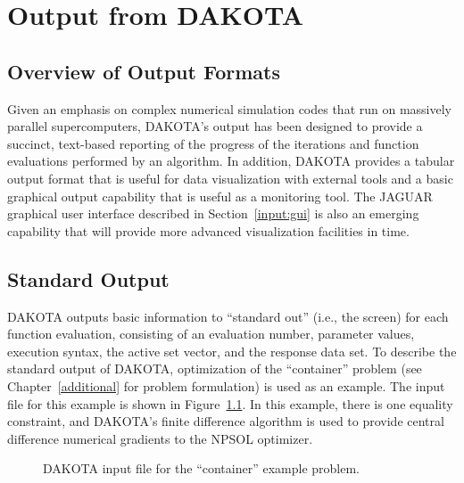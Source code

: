 \chapter{Output from DAKOTA}\label{output}

\section{Overview of Output Formats}\label{output:overview}

Given an emphasis on complex numerical simulation codes that run on
massively parallel supercomputers, DAKOTA's output has been designed
to provide a succinct, text-based reporting of the progress of the
iterations and function evaluations performed by an algorithm. In
addition, DAKOTA provides a tabular output format that is useful for
data visualization with external tools and a basic graphical output
capability that is useful as a monitoring tool. The JAGUAR graphical
user interface described in Section~\ref{input:gui} is also an
emerging capability that will provide more advanced visualization
facilities in time.

\section{Standard Output}\label{output:standard}

DAKOTA outputs basic information to ``standard out'' (i.e., the
screen) for each function evaluation, consisting of an evaluation
number, parameter values, execution syntax, the active set vector, and
the response data set. To describe the standard output of DAKOTA,
optimization of the ``container'' problem (see
Chapter~\ref{additional} for problem formulation) is used as an
example. The input file for this example is shown in
Figure~\ref{output:incont}. In this example, there is one equality
constraint, and DAKOTA's finite difference algorithm is used to
provide central difference numerical gradients to the NPSOL optimizer.
\begin{figure}
  \begin{small}
    \begin{bigbox}
    \end{bigbox}
  \end{small}
  \caption{DAKOTA input file for the ``container'' example problem.}
  \label{output:incont}
\end{figure}

\clearpage

